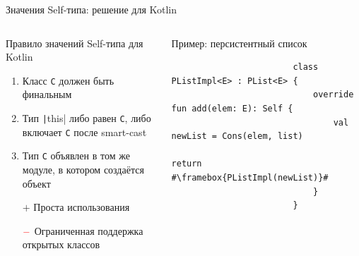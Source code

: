 \documentclass[usenames, dvipsnames]{beamer}
\begin{document}
\begin{frame}[fragile]{Значения Self-типа: решение для Kotlin}
        \begin{columns}[onlytextwidth]
            \begin{column}{0.485\textwidth}
                \begin{block}{Правило значений Self-типа для Kotlin}
                    \begin{enumerate}
                        \item Класс \texttt{C} должен быть финальным
                        \item Тип \texttt|this|
                        либо равен \texttt{С}, либо включает \texttt{C} после smart-cast
                        \item Тип \texttt{C} объявлен в том же модуле, в котором создаётся объект
                    \end{enumerate}
                \end{block}
                \begin{block}{}
                    \begin{itemize}
                        \item[$+$] Проста использования
                        \item[$\color{red} -$] Ограниченная поддержка открытых классов
                    \end{itemize}
                \end{block}
            \end{column}\hfill%
            \begin{column}{0.485\textwidth}
                \begin{block}{Пример: персистентный список}
                    \begin{verbatim}
                        class PListImpl<E> : PList<E> {
                            override fun add(elem: E): Self {
                                val newList = Cons(elem, list)
                                return #\framebox{PListImpl(newList)}#
                            }
                        }
                    \end{verbatim}
                \end{block}
            \end{column}
        \end{columns}
    \end{frame}
\end{document}
